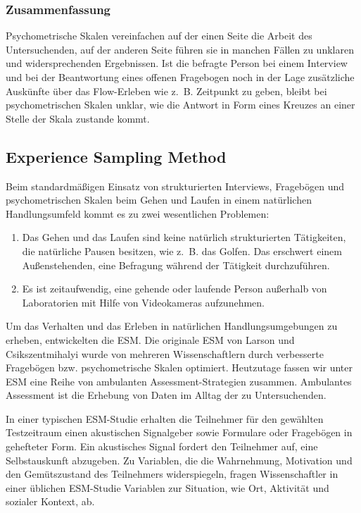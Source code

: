 \subsubsection{Zusammenfassung}

Psychometrische Skalen vereinfachen auf der einen Seite die Arbeit des Untersuchenden, auf der anderen Seite führen sie in manchen Fällen zu unklaren und widersprechenden Ergebnissen. Ist die befragte Person bei einem Interview und bei der Beantwortung eines offenen Fragebogen noch in der Lage zusätzliche Auskünfte über das Flow-Erleben wie z.~B. Zeitpunkt zu geben, bleibt bei psychometrischen Skalen unklar, wie die Antwort in Form eines Kreuzes an einer Stelle der Skala zustande kommt.

\subsection{Experience Sampling Method}

Beim standardmäßigen Einsatz von strukturierten Interviews, Fragebögen und psychometrischen Skalen beim Gehen und Laufen in einem natürlichen Handlungsumfeld kommt es zu zwei wesentlichen Problemen:
\begin{enumerate}
	\item Das Gehen und das Laufen sind keine natürlich strukturierten Tätigkeiten, die natürliche Pausen besitzen, wie z.~B. das Golfen. Das erschwert einem Außenstehenden, eine Befragung während der Tätigkeit durchzuführen.
	\item Es ist zeitaufwendig, eine gehende oder laufende Person außerhalb von Laboratorien mit Hilfe von Videokameras aufzunehmen.
\end{enumerate}

Um das Verhalten und das Erleben in natürlichen Handlungsumgebungen zu erheben, entwickelten \citep{Larson1983} die \ac{ESM}. Die originale \ac{ESM} von Larson und Csikszentmihalyi wurde von mehreren Wissenschaftlern \citep[z.~B. ][]{Schallberger2001, Rheinberg2003} durch verbesserte Fragebögen bzw. psychometrische Skalen optimiert. Heutzutage fassen wir unter \ac{ESM} eine Reihe von ambulanten Assessment-Strategien zusammen. Ambulantes Assessment ist die Erhebung von Daten im Alltag der zu Untersuchenden.

In einer typischen \ac{ESM}-Studie erhalten die Teilnehmer für den gewählten Testzeitraum einen akustischen Signalgeber sowie Formulare oder Fragebögen in gehefteter Form. Ein akustisches Signal fordert den Teilnehmer auf, eine Selbstauskunft abzugeben. Zu Variablen, die die Wahrnehmung, Motivation und den Gemütszustand des Teilnehmers widerspiegeln, fragen Wissenschaftler in einer üblichen \ac{ESM}-Studie Variablen zur Situation, wie Ort, Aktivität und sozialer Kontext, ab.

